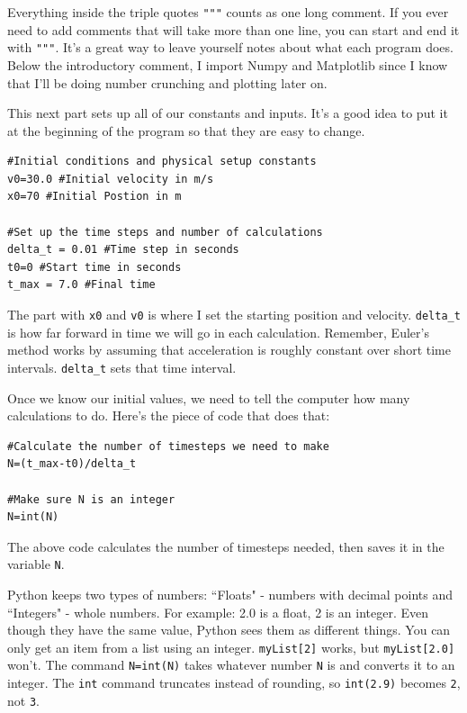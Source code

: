 \documentclass[twoside,11pt,ShortChapTitles]{BYUTextbook}
\begin{document}
Everything inside the triple quotes \lstinline[columns=fixed]!"""! counts as one long comment.  If you ever need to add comments that will take more than one line, you can start and end it with \lstinline[columns=fixed]!"""!.  It's a great way to leave yourself notes about what each program does.
Below the introductory comment, I import Numpy and Matplotlib since I know that I'll be doing number crunching and plotting later on.

This next part sets up all of our constants and inputs.  It's a good idea to put it at the beginning of the program so that they are easy to change.
\begin{lstlisting}
#Initial conditions and physical setup constants
v0=30.0 #Initial velocity in m/s
x0=70 #Initial Postion in m

#Set up the time steps and number of calculations
delta_t = 0.01 #Time step in seconds
t0=0 #Start time in seconds
t_max = 7.0 #Final time

\end{lstlisting}

The part with \lstinline[columns=fixed]!x0! and \lstinline[columns=fixed]!v0! is where I set the starting position and velocity.  \lstinline[columns=fixed]!delta_t! is how far forward in time we will go in each calculation.  Remember, Euler's method works by assuming that acceleration is roughly constant over short time intervals.  \lstinline[columns=fixed]!delta_t! sets that time interval.

Once we know our initial values, we need to tell the computer how many calculations to do.  Here's the piece of code that does that:

\begin{lstlisting}
#Calculate the number of timesteps we need to make
N=(t_max-t0)/delta_t

#Make sure N is an integer
N=int(N)
\end{lstlisting}

The above code calculates the number of timesteps needed, then saves it in the variable \lstinline[columns=fixed]!N!. 

Python keeps two types of numbers: ``Floats" - numbers with decimal points and ``Integers" - whole numbers. For example: 2.0 is a float, 2 is an integer.  Even though they have the same value, Python sees them as different things.
You can only get an item from a list using an integer.
\lstinline[columns=fixed]!myList[2]! works, but \lstinline[columns=fixed]!myList[2.0]! won't.  The command \lstinline[columns=fixed]!N=int(N)! takes whatever number \lstinline[columns=fixed]!N! is and converts it to an integer.  The \lstinline[columns=fixed]!int! command truncates instead of rounding, so \lstinline[columns=fixed]!int(2.9)! becomes \lstinline[columns=fixed]!2!, not \lstinline[columns=fixed]!3!.
\end{document}
